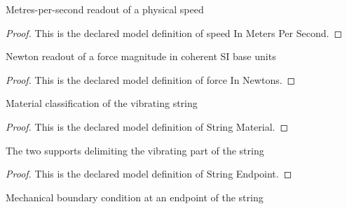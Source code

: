 \begin{definition}
  \label{def:physics:phyx-mini-0295:phyxminiproblems-problemphyxmini0295-speedinmeterspersecond}
  Metres-per-second readout of a physical speed
\end{definition}
\begin{proof}
  This is the declared model definition of speed In Meters Per Second.
\end{proof}
\begin{definition}
  \label{def:physics:phyx-mini-0295:phyxminiproblems-problemphyxmini0295-forceinnewtons}
  Newton readout of a force magnitude in coherent SI base units
\end{definition}
\begin{proof}
  This is the declared model definition of force In Newtons.
\end{proof}
\begin{definition}
  \label{def:physics:phyx-mini-0295:phyxminiproblems-problemphyxmini0295-stringmaterial}
  Material classification of the vibrating string
\end{definition}
\begin{proof}
  This is the declared model definition of String Material.
\end{proof}
\begin{definition}
  \label{def:physics:phyx-mini-0295:phyxminiproblems-problemphyxmini0295-stringendpoint}
  The two supports delimiting the vibrating part of the string
\end{definition}
\begin{proof}
  This is the declared model definition of String Endpoint.
\end{proof}
\begin{definition}
  \label{def:physics:phyx-mini-0295:phyxminiproblems-problemphyxmini0295-endpointboundary}
  Mechanical boundary condition at an endpoint of the string
\end{definition}
